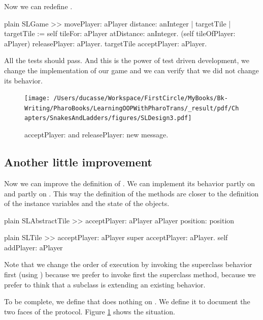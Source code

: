 \documentclass[10pt,twoside,english]{_support/latex/sbabook/sbabook}
\begin{document}
Now we can redefine .

\begin{displaycode}{plain}
SLGame >> movePlayer: aPlayer distance: anInteger
	| targetTile |
	targetTile := self tileFor: aPlayer atDistance: anInteger.
	(self tileOfPlayer: aPlayer) releasePlayer: aPlayer.
	targetTile acceptPlayer: aPlayer.
\end{displaycode}

All the tests should pass. And this is the power of test driven development, we change the implementation of our game and we can verify that we did not change its behavior.


\begin{figure}

\begin{center}
\texttt{[image: /Users/ducasse/Workspace/FirstCircle/MyBooks/Bk-Writing/PharoBooks/LearningOOPWithPharoTrans/\_result/pdf/Chapters/SnakesAndLadders/figures/SLDesign3.pdf]}\caption{acceptPlayer: and releasePlayer: new message.\label{fig:sldesign3}}\end{center}
\end{figure}

\subsection{Another little improvement}
Now we can improve the definition of . We can implement its behavior partly on  and partly on . This way the definition of the methods are closer to the definition of the instance variables and the state of the objects.

\begin{displaycode}{plain}
SLAbstractTile >> acceptPlayer: aPlayer
	aPlayer position: position
\end{displaycode}

\begin{displaycode}{plain}
SLTile >> acceptPlayer: aPlayer
	super acceptPlayer: aPlayer.
	self addPlayer: aPlayer
\end{displaycode}

Note that we change the order of execution by invoking the superclass behavior first (using ) because we prefer to invoke first the superclass method, because we prefer to think that a subclass is extending an existing behavior. 

To be complete, we define that  does nothing on . We define it to document the two faces of the protocol.
Figure \ref{fig:sldesign3} shows the situation. 
\end{document}
